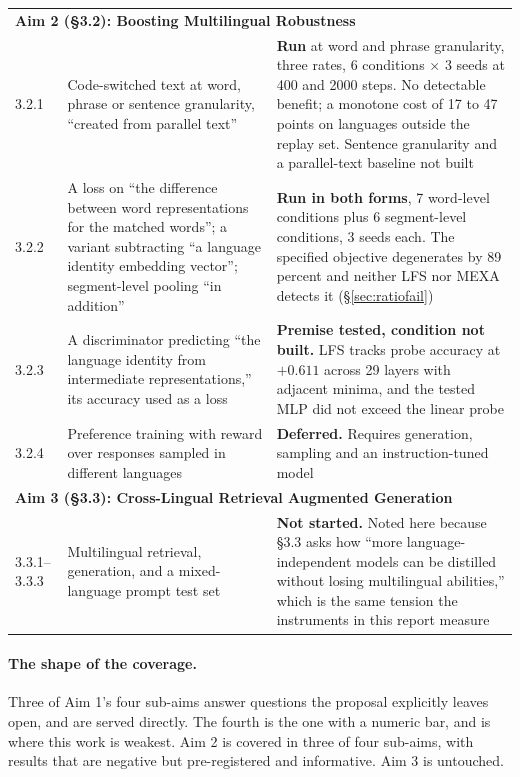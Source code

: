 \documentclass[11pt,a4paper]{article}
\begin{document}
\begin{table}[H]
\begin{tabular}{p{1.5cm}p{4.4cm}p{8.3cm}}
\midrule
\multicolumn{3}{l}{\textbf{Aim 2 (\S3.2): Boosting Multilingual Robustness}} \\[3pt]
3.2.1 & Code-switched text at word, phrase or sentence granularity, ``created
from parallel text'' &
\textbf{Run} at word and phrase granularity, three rates, 6 conditions $\times$ 3
seeds at 400 and 2000 steps. No detectable benefit; a monotone cost of 17 to
47 points on languages outside the replay set. Sentence granularity and a
parallel-text baseline not built \\[3pt]
3.2.2 & A loss on ``the difference between word representations for the
matched words''; a variant subtracting ``a language identity embedding
vector''; segment-level pooling ``in addition'' &
\textbf{Run in both forms}, 7 word-level conditions plus 6 segment-level conditions, 3
seeds each. The specified objective degenerates by 89 percent and neither
LFS nor MEXA detects it (\S\ref{sec:ratiofail}) \\[3pt]
3.2.3 & A discriminator predicting ``the language identity from intermediate
representations,'' its accuracy used as a loss &
\textbf{Premise tested, condition not built.} LFS tracks probe accuracy at
$+0.611$ across 29 layers with adjacent minima, and the tested MLP did not exceed the linear probe \\[3pt]
3.2.4 & Preference training with reward over responses sampled in different
languages &
\textbf{Deferred.} Requires generation, sampling and an instruction-tuned
model \\[3pt]
\midrule
\multicolumn{3}{l}{\textbf{Aim 3 (\S3.3): Cross-Lingual Retrieval Augmented Generation}} \\[3pt]
3.3.1--3.3.3 & Multilingual retrieval, generation, and a mixed-language
prompt test set &
\textbf{Not started.} Noted here because \S3.3 asks how ``more
language-independent models can be distilled without losing multilingual
abilities,'' which is the same tension the instruments in this report measure
\\
\bottomrule
\end{tabular}
\end{table}

\paragraph{The shape of the coverage.} Three of Aim 1's four sub-aims answer
questions the proposal explicitly leaves open, and are served directly. The
fourth is the one with a numeric bar, and is where this work is weakest. Aim
2 is covered in three of four sub-aims, with results that are negative but
pre-registered and informative. Aim 3 is untouched.
\end{document}
